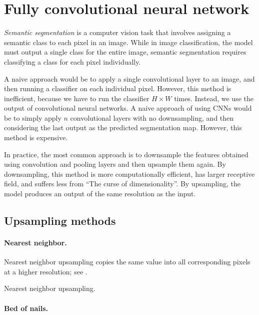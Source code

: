 \section{Fully convolutional neural network}

\textit{Semantic segmentation} is a computer vision task that involves assigning a semantic class to
each pixel in an image. While in image classification, the model must output a single class for the
entire image, semantic segmentation requires classifying a class for each pixel individually.

A naive approach would be to apply a single convolutional layer to an image, and then running a
classifier on each individual pixel. However, this method is inefficient, because we have to run
the classifier $H\times W$ times. Instead, we use the output of convolutional neural networks. A
naive approach of using CNNs would be to simply apply $n$ convolutional layers with no
downsampling, and then considering the last output as the predicted segmentation map. However, this
method is expensive.

In practice, the most common approach is to downsample the features obtained using convolution and
pooling layers and then upsample them again. By downsampling, this method is more computationally
efficient, has larger receptive field, and suffers less from ``The curse of dimensionality''. By
upsampling, the model produces an output of the same resolution as the input.

\subsection{Upsampling methods}

\paragraph{Nearest neighbor.}

Nearest neighbor upsampling copies the same value into all corresponding pixels at a higher
resolution; see .

\begin{marginfigure}
    \centering
    \caption{Nearest neighbor upsampling.}
    \label{fig:nearest-neighbor-upsampling}
\end{marginfigure}

\paragraph{Bed of nails.}

